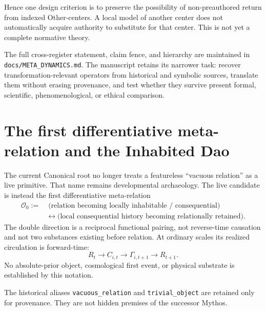 \documentclass[11pt]{article}
\begin{document}
Hence one design criterion is to preserve the possibility of non-preauthored
return from indexed Other-centers.  A local model of another center does not
automatically acquire authority to substitute for that center.  This is not yet
a complete normative theory.

The full cross-register statement, claim fence, and hierarchy are maintained in
\texttt{docs/META\_DYNAMICS.md}.  The manuscript retains its narrower task:
recover transformation-relevant operators from historical and symbolic sources,
translate them without erasing provenance, and test whether they survive
present formal, scientific, phenomenological, or ethical comparison.

\section{The first differentiative meta-relation and the Inhabited Dao}

The current Canonical root no longer treats a featureless ``vacuous relation''
as a live primitive.  That name remains developmental archaeology.  The live
candidate is instead the first differentiative meta-relation
\begin{equation}
\boxed{\begin{aligned}
\mathcal O_0 :=&\;\bigl(\text{relation becoming locally inhabitable / consequential}\bigr)\\
&\leftrightarrow\bigl(\text{local consequential history becoming relationally retained}\bigr).
\end{aligned}}
\end{equation}
The double direction is a reciprocal functional pairing, not reverse-time
causation and not two substances existing before relation.  At ordinary scales
its realized circulation is forward-time:
\begin{equation}
R_t\to C_{i,t}\to \Gamma_{i,t+1}\to R_{t+1}.
\end{equation}
No absolute-prior object, cosmological first event, or physical substrate is
established by this notation.

\begin{statusnote}
The historical aliases \texttt{vacuous\_relation} and
\texttt{trivial\_object} are retained only for provenance.  They are not hidden
premises of the successor Mythos.
\end{statusnote}
\end{document}
